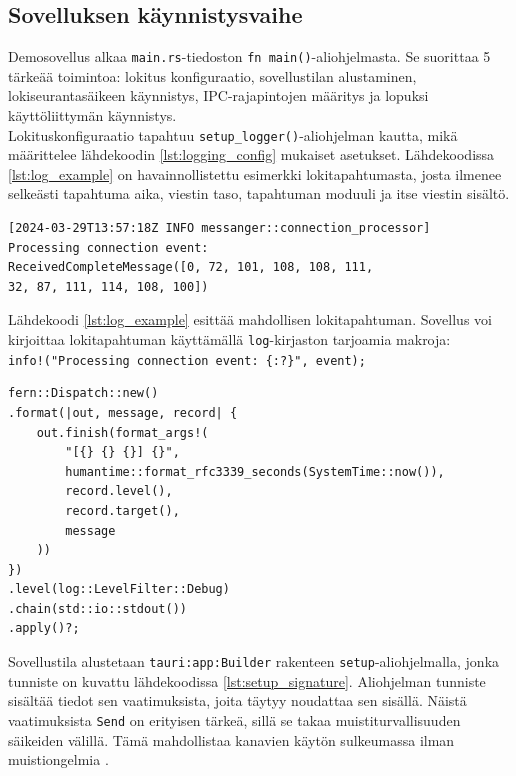 \documentclass[a4paper,12pt]{article}
\begin{document}
    \subsection{Sovelluksen käynnistysvaihe}

    Demosovellus alkaa \lstinline{main.rs}-tiedoston \lstinline{fn main()}-aliohjelmasta.
    Se suorittaa 5 tärkeää toimintoa: lokitus
    konfiguraatio, sovellustilan alustaminen, lokiseurantasäikeen käynnistys, IPC-rajapintojen määritys ja lopuksi käyttöliittymän käynnistys. \\
    
    Lokituskonfiguraatio tapahtuu \lstinline{setup_logger()}-aliohjelman kautta, mikä määrittelee lähdekoodin \ref{lst:logging_config} mukaiset asetukset.
    Lähdekoodissa \ref{lst:log_example} on havainnollistettu esimerkki lokitapahtumasta, josta ilmenee selkeästi tapahtuma aika,
    viestin taso, tapahtuman moduuli ja itse viestin sisältö.

    \begin{lstlisting}[caption={Esimerkki lokitapahtumasta.}, label={lst:log_example}]
[2024-03-29T13:57:18Z INFO messanger::connection_processor]
Processing connection event:
ReceivedCompleteMessage([0, 72, 101, 108, 108, 111,
32, 87, 111, 114, 108, 100])
    \end{lstlisting}
    
    Lähdekoodi \ref{lst:log_example} esittää mahdollisen lokitapahtuman. Sovellus voi kirjoittaa lokitapahtuman käyttämällä \lstinline{log}-kirjaston tarjoamia makroja:\\ \lstinline|info!("Processing connection event: {:?}", event);|\par

    \begin{lstlisting}[caption={Lokituskonfiguraatio}, label={lst:logging_config}]
fern::Dispatch::new()
.format(|out, message, record| {
    out.finish(format_args!(
        "[{} {} {}] {}",
        humantime::format_rfc3339_seconds(SystemTime::now()),
        record.level(),
        record.target(),
        message
    ))
})
.level(log::LevelFilter::Debug)
.chain(std::io::stdout())
.apply()?;
    \end{lstlisting}


    Sovellustila alustetaan \lstinline{tauri:app:Builder} rakenteen \lstinline{setup}-aliohjelmalla, jonka tunniste on kuvattu lähdekoodissa \ref{lst:setup_signature}. Aliohjelman tunniste sisältää tiedot sen vaatimuksista, joita täytyy noudattaa sen sisällä. Näistä vaatimuksista \lstinline{Send} on erityisen tärkeä, sillä se takaa muistiturvallisuuden säikeiden välillä. Tämä mahdollistaa kanavien käytön sulkeumassa ilman muistiongelmia \cite[luku 8.2]{rust-book}. \par
\end{document}
